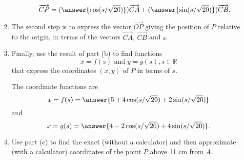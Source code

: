 \documentclass{ximera}
\begin{document}
\begin{question}
\begin{expandable}
\begin{enumerate}
\begin{enumerate}
\[
       \overrightarrow{CP} = (\answer{\cos (s/\sqrt{20})}) \overrightarrow{CA} + (\answer{\sin (s/\sqrt{20})}) \overrightarrow{CB} .
\]
\end{enumerate}

\item The second step is to express the vector  $\overrightarrow{OP}$ giving the position of $P$ relative to the origin, in terms of
the vectors $\overrightarrow{CA}$, $\overrightarrow{CB}$ and $s$.

\item Finally, use the result of part (b) to find functions
\[
    x = f(s) \text{ and } y=g(s) , s\in \mathbb{R}
\]
that express the coordinates $(x,y)$ of $P$ in terms of $s$.

The coordinate functions are
\[
    x = f(s) = \answer{5 + 4\cos (s/\sqrt{20}) +2\sin (s/\sqrt{20}) }
\]
and
\[
  x = g(s) = \answer{4 - 2\cos (s/\sqrt{20}) +4\sin (s/\sqrt{20}) } .
\]

\item Use part (c) to find the exact (without a calculator) and then approximate (with a calculator) coordinates of the point $P$ above 11 cm from $A$. 
\end{enumerate}

\end{expandable}

\end{question}
\end{document}
